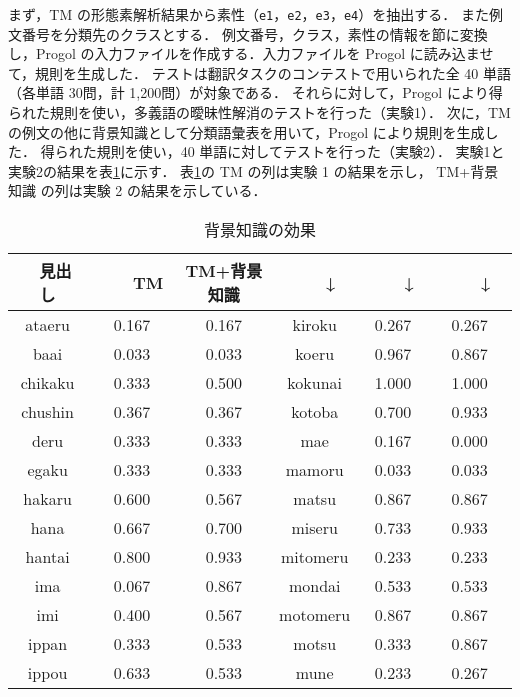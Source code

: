 まず，TM の形態素解析結果から素性（\verb|e1|，\verb|e2|，\verb|e3|，\verb|e4|）を抽出する．
また例文番号を分類先のクラスとする．
例文番号，クラス，素性の情報を節に変換し，Progol の入力ファイルを作成する．入力ファイルを 
Progol に読み込ませて，規則を生成した．
テストは翻訳タスクのコンテストで用いられた全 40 単語（各単語 30問，計 1,200問）が対象である．
それらに対して，Progol により得られた規則を使い，多義語の曖昧性解消のテストを行った（実験1）．
次に，TM の例文の他に背景知識として分類語彙表を用いて，Progol により規則を生成した．
得られた規則を使い，40 単語に対してテストを行った（実験2）．
実験1と実験2の結果を\mbox{表\ref{result1}}に示す．
\mbox{表\ref{result1}}の TM の列は実験 1 の結果を示し，
TM+背景知識 の列は実験 2 の結果を示している．

\begin{table}[htbp]
  \begin{center}
    \leavevmode
    \caption{背景知識の効果}\label{result1}
    \begin{tabular}{|c|c|c||c|c|c|} \hline
　見出し　   & 　　TM　　 &  TM+背景知識   & 　　↓　　 & 　　↓　　  & 　　↓　　　 \\ \hline
    ataeru &  0.167   &    0.167   &      kiroku &  0.267   &    0.267  \\
      baai &  0.033   &    0.033   &       koeru &  0.967   &    0.867  \\
   chikaku &  0.333   &    0.500   &     kokunai &  1.000   &    1.000  \\
   chushin &  0.367   &    0.367   &      kotoba &  0.700   &    0.933  \\
      deru &  0.333   &    0.333   &         mae &  0.167   &    0.000  \\
     egaku &  0.333   &    0.333   &      mamoru &  0.033   &    0.033  \\
    hakaru &  0.600   &    0.567   &       matsu &  0.867   &    0.867  \\
      hana &  0.667   &    0.700   &      miseru &  0.733   &    0.933  \\
    hantai &  0.800   &    0.933   &    mitomeru &  0.233   &    0.233  \\
       ima &  0.067   &    0.867   &      mondai &  0.533   &    0.533  \\
       imi &  0.400   &    0.567   &    motomeru &  0.867   &    0.867  \\
     ippan &  0.333   &    0.533   &       motsu &  0.333   &    0.867  \\
     ippou &  0.633   &    0.533   &        mune &  0.233   &    0.267  \\

\end{tabular}
\end{center}
\end{table}

